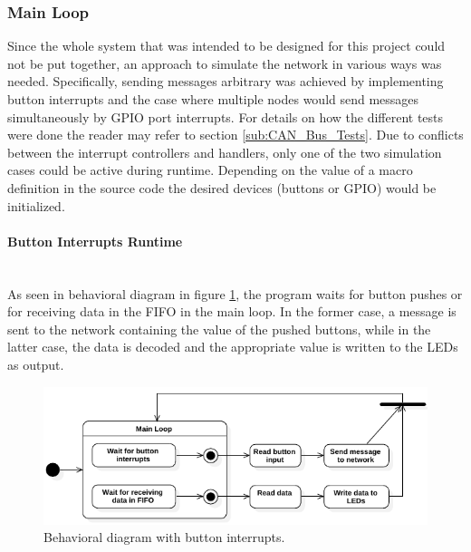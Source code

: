 \subsubsection{Main Loop}
Since the whole system that was intended to be designed for this project could not be put together, an approach to simulate the network in various ways was needed.
Specifically, sending messages arbitrary was achieved by implementing button interrupts and the case where multiple nodes would send messages simultaneously by GPIO port interrupts.
For details on how the different tests were done the reader may refer to section \ref{sub:CAN_Bus_Tests}.
Due to conflicts between the interrupt controllers and handlers, only one of the two simulation cases could be active during runtime.
Depending on the value of a macro definition in the source code the desired devices (buttons or GPIO) would be initialized.

\paragraph{Button Interrupts Runtime}~\\
As seen in behavioral diagram in figure \ref{fig:StateDiagram_CANSoft_BtnsIntr}, the program waits for button pushes or for receiving data in the FIFO in the main loop.
In the former case, a message is sent to the network containing the value of the pushed buttons, while in the latter case, the data is decoded and the appropriate value is written to the LEDs as output.
\begin{figure}[h!]
	\centering
	\includegraphics[width = 1\linewidth]{graphics/StateDiagram_CANSoft_BtnsIntr.pdf}
	\caption{Behavioral diagram with button interrupts.}
	\label{fig:StateDiagram_CANSoft_BtnsIntr}
\end{figure}

